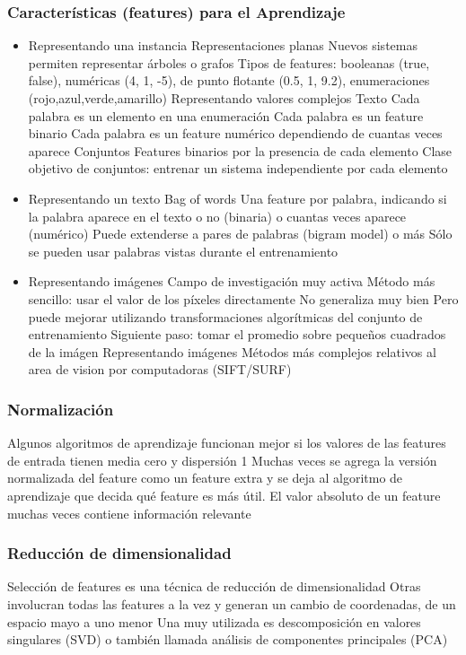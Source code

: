 \documentclass[a4paper,10pt]{article}
\begin{document}
\subsubsection{Características (features) para el Aprendizaje}
\begin{itemize}
 \item Representando una instancia
Representaciones planas
Nuevos sistemas permiten representar árboles o grafos
Tipos de features: booleanas (true, false), numéricas (4, 1, -5), de punto flotante (0.5, 1, 9.2), enumeraciones (rojo,azul,verde,amarillo)
Representando valores complejos
Texto
Cada palabra es un elemento en una enumeración
Cada palabra es un feature binario
Cada palabra es un feature numérico dependiendo de cuantas veces aparece
Conjuntos
Features binarios por la presencia de cada elemento
Clase objetivo de conjuntos: entrenar un sistema independiente por cada elemento
  \item Representando un texto
Bag of words
Una feature por palabra, indicando si la palabra aparece en el texto o no (binaria) o cuantas veces aparece (numérico)
Puede extenderse a pares de palabras (bigram model) o más
Sólo se pueden usar palabras vistas durante el entrenamiento
\item Representando imágenes
Campo de investigación muy activa
Método más sencillo: usar el valor de los píxeles directamente
No generaliza muy bien
Pero puede mejorar utilizando transformaciones algorítmicas del conjunto de entrenamiento
Siguiente paso: tomar el promedio sobre pequeños cuadrados de la imágen
Representando imágenes
Métodos más complejos relativos al area de vision por computadoras (SIFT/SURF)
\end{itemize}


\subsubsection{Normalización}
Algunos algoritmos de aprendizaje funcionan mejor si los valores de las features de entrada tienen media cero y dispersión 1
Muchas veces se agrega la versión normalizada del feature como un feature extra y se deja al algoritmo de aprendizaje que decida qué feature es más útil.
El valor absoluto de un feature muchas veces contiene información relevante

\subsubsection{Reducción de dimensionalidad}
Selección de features es una técnica de reducción de dimensionalidad
Otras involucran todas las features a la vez y generan un cambio de coordenadas, de un espacio mayo a uno menor
Una muy utilizada es descomposición en valores singulares (SVD) o también llamada análisis de componentes principales (PCA)
\end{document}
